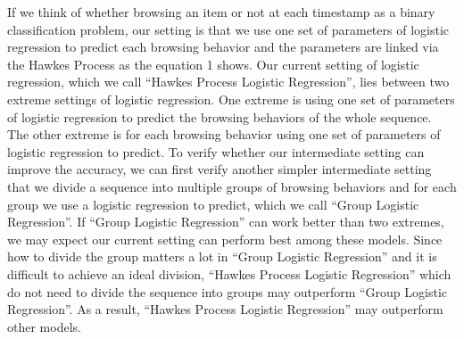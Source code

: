 \documentclass[11pt]{article}
\begin{document}
If we think of whether browsing an item or not at each timestamp as a binary classification problem, our setting is that we use one set of parameters of logistic regression to predict each browsing behavior and the parameters are linked via the Hawkes Process as the equation 1 shows. Our current setting of logistic regression, which we call “Hawkes Process Logistic Regression”, lies between two extreme settings of logistic regression. One extreme is using one set of parameters of logistic regression to predict the browsing behaviors of the whole sequence. The other extreme is for each browsing behavior using one set of parameters of logistic regression to predict. To verify whether our intermediate setting can improve the accuracy, we can first verify another simpler intermediate setting that we divide a sequence into multiple groups of browsing behaviors and for each group we use a logistic regression to predict, which we call “Group Logistic Regression”. If “Group Logistic Regression” can work better than two extremes, we may expect our current setting can perform best among these models. Since how to divide the group matters a lot in “Group Logistic Regression” and it is difficult to achieve an ideal division, “Hawkes Process Logistic Regression” which do not need to divide the sequence into groups may outperform “Group Logistic Regression”. As a result, “Hawkes Process Logistic Regression” may outperform other models.




\end{document}
